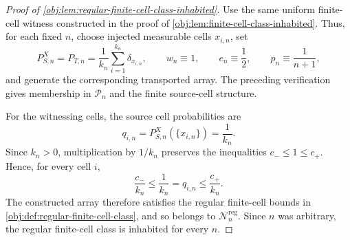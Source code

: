 \begin{proof}[Proof of \cref{obj:lem:regular-finite-cell-class-inhabited}]
Use the same uniform finite-cell witness constructed in the proof of \cref{obj:lem:finite-cell-class-inhabited}. Thus, for each fixed \(n\), choose injected measurable cells \(x_{i,n}\), set
\[
P_{S,n}^X=P_{T,n}
=
\frac1{k_n}\sum_{i=1}^{k_n}\delta_{x_{i,n}},
\qquad
w_n\equiv1,\qquad
e_n\equiv\frac12,\qquad
p_n\equiv\frac1{n+1},
\]
and generate the corresponding transported array. The preceding verification gives membership in \(\mathcal P_n\) and the finite source-cell structure. %

For the witnessing cells, the source cell probabilities are
\[
q_{i,n}=P_{S,n}^X(\{x_{i,n}\})=\frac1{k_n}.
\]
Since \(k_n>0\), multiplication by \(1/k_n\) preserves the inequalities \(c_-\le1\le c_+\). Hence, for every cell \(i\),
\[
\frac{c_-}{k_n}\le\frac1{k_n}=q_{i,n}\le\frac{c_+}{k_n}.
\]
The constructed array therefore satisfies the regular finite-cell bounds in \cref{obj:def:regular-finite-cell-class}, and so belongs to \(\mathcal N_n^{\mathrm{reg}}\). Since \(n\) was arbitrary, the regular finite-cell class is inhabited for every \(n\). %
\end{proof}
